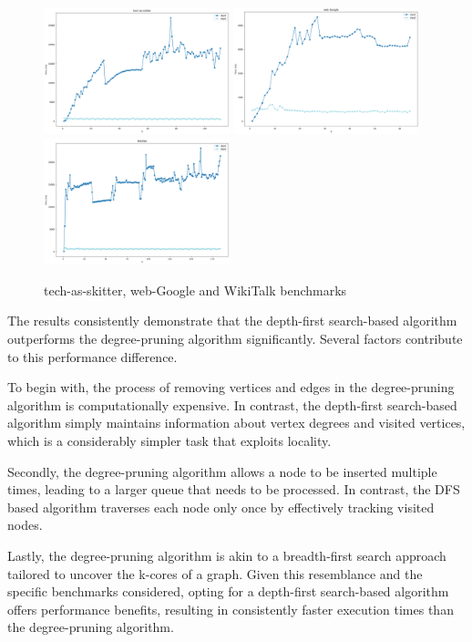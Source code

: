 \begin{figure}[H]
	\centering
	\includegraphics[width=0.48\textwidth]{Figures/tech-as-skitter.png} 
        \includegraphics[width=0.48\textwidth]{Figures/web-Google.png} 
        \includegraphics[width=0.48\textwidth]{Figures/WikiTalk.png} 
        \caption{tech-as-skitter, web-Google and WikiTalk benchmarks}
        \label{fig:skitter_google_wiki}
\end{figure}

The results consistently demonstrate that the depth-first search-based algorithm outperforms the degree-pruning algorithm significantly. Several factors contribute to this performance difference. 

To begin with, the process of removing vertices and edges in the degree-pruning algorithm is computationally expensive. In contrast, the depth-first search-based algorithm simply maintains information about vertex degrees and visited vertices, which is a considerably simpler task that exploits locality.

Secondly, the degree-pruning algorithm allows a node to be inserted multiple times, leading to a larger queue that needs to be processed. In contrast, the DFS based algorithm traverses each node only once by effectively tracking visited nodes.

Lastly, the degree-pruning algorithm is akin to a breadth-first search approach tailored to uncover the k-cores of a graph. Given this resemblance and the specific benchmarks considered, opting for a depth-first search-based algorithm offers performance benefits, resulting in consistently faster execution times than the degree-pruning algorithm.